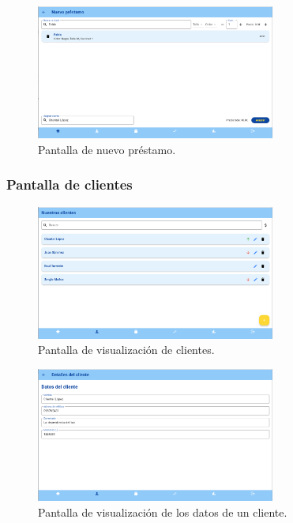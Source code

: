 \begin{figure}[H]
	\centering
	\includegraphics[width=0.7\textwidth]{imagenes/TerceraIteracion/nuevoPrestamo.png}
	\caption{Pantalla de nuevo préstamo.}
\end{figure}

\subsubsection{Pantalla de clientes}

\begin{figure}[H]
	\centering
	\includegraphics[width=0.7\textwidth]{imagenes/TerceraIteracion/clientView.png}
	\caption{Pantalla de visualización de clientes.}
\end{figure}

\begin{figure}[H]
	\centering
	\includegraphics[width=0.7\textwidth]{imagenes/TerceraIteracion/clientDetails.png}
	\caption{Pantalla de visualización de los datos de un cliente.}
\end{figure}

